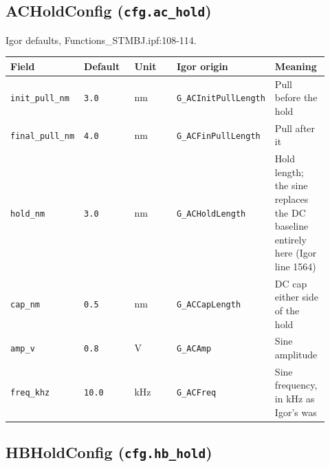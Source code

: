 \subsection{ACHoldConfig (\texttt{cfg.\discretionary{}{}{}ac\_\discretionary{}{}{}hold})}

Igor defaults, Functions\_STMBJ.ipf:108-114.

\footnotesize\setlength{\LTleft}{0pt}\setlength{\LTright}{\fill}
\begin{longtable}{@{}>{\raggedright\arraybackslash}p{0.184\linewidth}>{\raggedright\arraybackslash}p{0.184\linewidth}>{\raggedright\arraybackslash}p{0.184\linewidth}>{\raggedright\arraybackslash}p{0.184\linewidth}>{\raggedright\arraybackslash}p{0.184\linewidth}@{}}
\toprule
\textbf{Field} & \textbf{Default} & \textbf{Unit} & \textbf{Igor origin} & \textbf{Meaning} \\
\midrule\endhead
\texttt{init\_\discretionary{}{}{}pull\_\discretionary{}{}{}nm} & \texttt{3.\discretionary{}{}{}0} & nm & \texttt{G\_\discretionary{}{}{}ACInit\discretionary{}{}{}Pull\discretionary{}{}{}Length} & Pull before the hold \\
\texttt{final\_\discretionary{}{}{}pull\_\discretionary{}{}{}nm} & \texttt{4.\discretionary{}{}{}0} & nm & \texttt{G\_\discretionary{}{}{}ACFin\discretionary{}{}{}Pull\discretionary{}{}{}Length} & Pull after it \\
\texttt{hold\_\discretionary{}{}{}nm} & \texttt{3.\discretionary{}{}{}0} & nm & \texttt{G\_\discretionary{}{}{}ACHold\discretionary{}{}{}Length} & Hold length; the sine replaces the DC baseline entirely here (Igor line 1564) \\
\texttt{cap\_\discretionary{}{}{}nm} & \texttt{0.\discretionary{}{}{}5} & nm & \texttt{G\_\discretionary{}{}{}ACCap\discretionary{}{}{}Length} & DC cap either side of the hold \\
\texttt{amp\_\discretionary{}{}{}v} & \texttt{0.\discretionary{}{}{}8} & V & \texttt{G\_\discretionary{}{}{}ACAmp} & Sine amplitude \\
\texttt{freq\_\discretionary{}{}{}khz} & \texttt{10.\discretionary{}{}{}0} & kHz & \texttt{G\_\discretionary{}{}{}ACFreq} & Sine frequency, in kHz as Igor's was \\
\bottomrule
\end{longtable}
\normalsize

\subsection{HBHoldConfig (\texttt{cfg.\discretionary{}{}{}hb\_\discretionary{}{}{}hold})}

